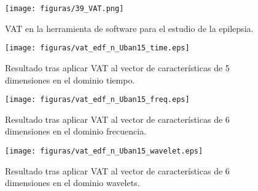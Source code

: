 \begin{figure}[H]
	\centering
	\texttt{[image: figuras/39\_VAT.png]}
	\caption{VAT en la herramienta de software para el estudio de la epilepsia.}
	\label{fig: Vat_toolbox}
\end{figure}

\begin{figure}[H]
	\centering
	\texttt{[image: figuras/vat\_edf\_n\_Uban15\_time.eps]}
	\caption{Resultado tras aplicar VAT al vector de características de 5 dimensiones en el dominio tiempo.}
	\label{fig: Vat_time}
\end{figure}
\begin{figure}[H]
	\centering
	\texttt{[image: figuras/vat\_edf\_n\_Uban15\_freq.eps]}
	\caption{Resultado tras aplicar VAT al vector de características de 6 dimensiones en el dominio frecuencia.}
	\label{fig: Vat_freq}
\end{figure}
\begin{figure}[H]
	\centering
	\texttt{[image: figuras/vat\_edf\_n\_Uban15\_wavelet.eps]}
	\caption{Resultado tras aplicar VAT al vector de características de 6 dimensiones en el dominio wavelets.}
	\label{fig: Vat_wavelet}
\end{figure}
